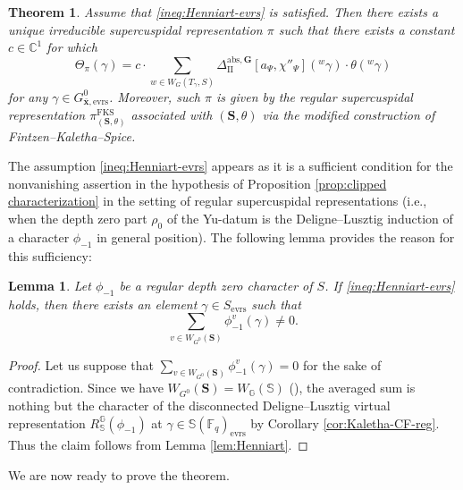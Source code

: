 \documentclass{amsart}
\newcommand{\abs}{\mathrm{abs}}
\newcommand{\evrs}{\mathrm{evrs}}
\newcommand{\FKS}{\mathrm{FKS}}
\newcommand{\x}{\mathbf{x}}
\newcommand{\F}{\mathbb{F}}
\newcommand{\bbC}{\mathbb{C}}
\newcommand{\bbS}{\mathbb{S}}
\newcommand{\bbG}{\mathbb{G}}
\newcommand{\bfG}{\mathbf{G}}
\newcommand{\bfS}{\mathbf{S}}
\newcommand{\II}{\mathrm{II}}
\theoremstyle{plain}
\newtheorem{theorem}[thm]{Theorem}
\newtheorem{lemma}[thm]{Lemma}
\theoremstyle{definition}
\theoremstyle{remark}
\theoremstyle{theorem}
\begin{document}
\begin{theorem}\label{thm:regsc-characterization}
    Assume that \eqref{ineq:Henniart-evrs} is satisfied. 
    Then there exists a unique irreducible supercuspidal representation $\pi$ such that there exists a constant $c \in \bbC^1$ for which
    \begin{equation}\label{eq:vreg id}
        \Theta_{\pi}(\gamma)
        =
        c\cdot
        \sum_{w\in W_{G}(T_{\gamma},S)}\Delta_{\II}^{\abs,\bfG}[a_{\Psi},\chi''_{\Psi}]({}^{w}\gamma)\cdot\theta({}^{w}\gamma)
        \end{equation}
        for any $\gamma\in G^{0}_{\bar{\x},\evrs}$.
        Moreover, such $\pi$ is given by the regular supercuspidal representation $\pi_{(\bfS, \theta)}^{\FKS}$ associated with $(\bfS,\theta)$ via the modified construction of Fintzen--Kaletha--Spice.
\end{theorem}

The assumption \eqref{ineq:Henniart-evrs} appears as it is a sufficient condition for the nonvanishing assertion in the hypothesis of Proposition \ref{prop:clipped characterization} in the setting of regular supercuspidal representations (i.e., when the depth zero part $\rho_0$ of the Yu-datum is the Deligne--Lusztig induction of a character $\phi_{-1}$ in general position). The following lemma provides the reason for this sufficiency:

\begin{lemma}\label{lem:nonvan}
Let $\phi_{-1}$ be a regular depth zero character of $S$.
    If \eqref{ineq:Henniart-evrs} holds, then there exists an element $\gamma \in S_{\evrs}$ such that
    \begin{equation*}
    \sum_{v \in W_{G^{0}}(\bfS)} \phi_{-1}^{v}(\gamma) \neq 0.
    \end{equation*}
\end{lemma}
    
\begin{proof}
    Let us suppose that $\sum_{v \in W_{G^{0}}(\bfS)} \phi_{-1}^{v}(\gamma)=0$ for the sake of contradiction.
    Since we have $W_{G^{0}}(\bfS)=W_{\bbG}(\bbS)$ (\cite[Lemma 3.2.2]{Kal19-sc}), the averaged sum is nothing but the character of the disconnected Deligne--Lusztig virtual representation $R_{\bbS}^{\bbG}(\phi_{-1})$ at $\gamma\in \bbS(\F_{q})_{\evrs}$ by Corollary \ref{cor:Kaletha-CF-reg}.
Thus the claim follows from Lemma \ref{lem:Henniart}.
\end{proof}

We are now ready to prove the theorem.
\end{document}
